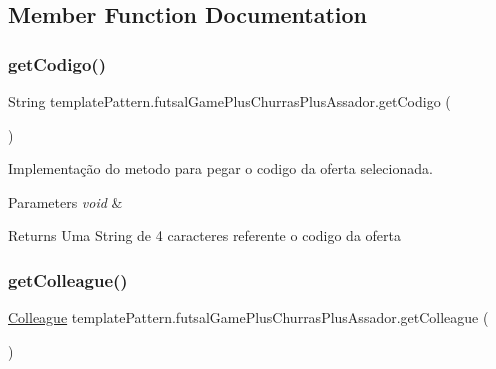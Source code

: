 \subsection{Member Function Documentation}
\mbox{\label{classtemplate_pattern_1_1futsal_game_plus_churras_plus_assador_a33a45cfeae47b969261ec614f7b82d8e}} 
\subsubsection{\texorpdfstring{getCodigo()}{getCodigo()}}
{\footnotesize\ttfamily String template\+Pattern.\+futsal\+Game\+Plus\+Churras\+Plus\+Assador.\+get\+Codigo (\begin{DoxyParamCaption}{ }\end{DoxyParamCaption})}



Implementação do metodo para pegar o codigo da oferta selecionada. 


\begin{DoxyParams}{Parameters}
{\em void} & \\
\hline
\end{DoxyParams}
\begin{DoxyReturn}{Returns}
Uma String de 4 caracteres referente o codigo da oferta 
\end{DoxyReturn}
\mbox{\label{classtemplate_pattern_1_1futsal_game_plus_churras_plus_assador_a035d6d90aea729d4ad420afdccab7447}} 
\subsubsection{\texorpdfstring{getColleague()}{getColleague()}}
{\footnotesize\ttfamily \mbox{\hyperlink{classmediator_pattern_1_1_colleague}{Colleague}} template\+Pattern.\+futsal\+Game\+Plus\+Churras\+Plus\+Assador.\+get\+Colleague (\begin{DoxyParamCaption}{ }\end{DoxyParamCaption})}



